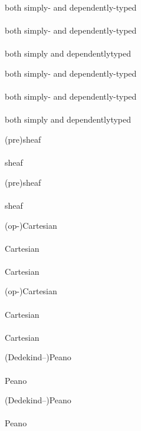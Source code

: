 \documentclass{article}
\begin{document}
\begin{verbatim*}
\begin{minipage}{0pt}
both simply- and dependently-typed\\\\
both simply\hyp{} and dependently\hyp{}typed\\\\
both simply\nbhyp{} and dependently\nbhyp{}typed\\
\end{minipage}
\end{verbatim*}
%
\begin{minipage}{0pt}
  both simply- and dependently-typed\\\\
  both simply\hyp{} and dependently\hyp{}typed\\\\
  both simply\nbhyp{} and dependently\nbhyp{}typed\\
\end{minipage}

\begin{verbatim*}
\begin{minipage}{0pt}
(pre)sheaf\\\\
sheaf\\
\end{minipage}
\end{verbatim*}
%
\begin{minipage}{0pt}
  (pre)sheaf\\\\
  sheaf\\
\end{minipage}

\begin{verbatim*}
\begin{minipage}{0pt}
(op-)Cartesian\\\\
Cartesian\\\\
Cartesian\\
\end{minipage}
\end{verbatim*}
%
\begin{minipage}{0pt}
  (op-)Cartesian\\\\
  Cartesian\\\\
  Cartesian\\
\end{minipage}

\begin{verbatim*}
\begin{minipage}{0pt}
(Dedekind--)Peano\\\\
Peano\\
\end{minipage}
\end{verbatim*}
%
\begin{minipage}{0pt}
  (Dedekind--)Peano\\\\
  Peano\\
\end{minipage}
\end{document}
